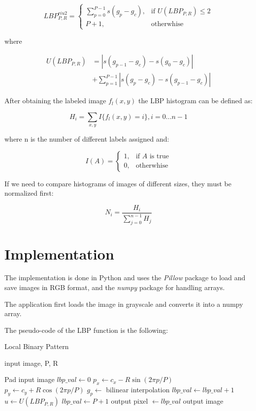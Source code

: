 \documentclass[10pt,twocolumn,letterpaper]{article}
\begin{document}
\[LBP_{P, R}^{riu2} = \begin{cases} \sum_{p = 0}^{P - 1}s(g_p - g_c), & \mbox{if } U(LBP_{P, R}) \le 2 \\ P + 1, & \mbox{otherwhise} \end{cases}\]

where

\begin{equation*}
	\begin{split} 
		U(LBP_{P, R}) & = |s(g_{p - 1} - g_c) - s(g_0 - g_c)| \\ & + \sum_{p = 1}^{P - 1}|s(g_p - g_c) - s(g_{p -1} - g_c)|
	\end{split}
\end{equation*}

After obtaining the labeled image $f_l(x, y)$ the LBP histogram can be defined as:

\[H_i = \sum_{x, y}I\{f_l(x, y) = i\}, i = 0...n -1\]

where n is the number of different labels assigned and:

\[I(A) = \begin{cases} 1, & \mbox{if } A \mbox{ is true} \\ 0, & \mbox{otherwhise} \end{cases}\]

If we need to compare histograms of images of different sizes, they must be normalized first:

\[N_i = \frac{H_i}{\sum_{j = 0}^{n - 1}H_j}\]

\section{Implementation}

The implementation is done in Python and uses the \textit{Pillow} package to load and save images in RGB format, and the \textit{numpy} package for handling arrays. 

The application first loads the image in grayscale and converts it into a numpy array.

The pseudo-code of the LBP function is the following:

\begin{algorithm}[H]
	\label{alg:lbp}
	\caption{Local Binary Pattern}
	\begin{algorithmic}
		\Require input image, P, R
		\vspace{0.5cm}
		
		\State Pad input image
		\For{$cx \in [0...height)$}
		\For{$cy \in [0...width$)}
		\State $lbp\_val \leftarrow 0$
		\For{$p \in [0...P)$}
		\State $p_x \leftarrow c_x - R\sin(2\pi p/P)$
		\State $p_y \leftarrow c_y + R\cos(2\pi p/P)$
		\State $g_p \leftarrow$ bilinear interpolation
			\State $lbp\_val \leftarrow lbp\_val + 1$
		\EndIf
		\EndFor
		\State $u \leftarrow U(LBP_{P, R})$
		\State $lbp\_val \leftarrow P + 1$
		\EndIf
		\State output pixel $\leftarrow lbp\_val$
		\EndFor
		\EndFor
		\State \Return output image
		
	\end{algorithmic}
\end{algorithm}
\end{document}
